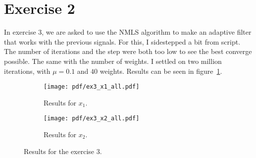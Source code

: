 \FloatBarrier
\section{Exercise 2}

In exercise 3, we are asked to use the NMLS algorithm to make an adaptive filter
that works with the previous signals. For this, I sidestepped a bit from script.
The number of iterations and the step were both too low to see the best converge
possible. The same with the number of weights. I settled on two million
iterations, with \(\mu=0.1\) and \(40\) weights. Results can be seen in
figure~\ref{fig:ex3res}.
\begin{figure}
    \centering
    \begin{subfigure}[t]{0.30\columnwidth}
        \centering
        \texttt{[image: pdf/ex3\_x1\_all.pdf]}
        \caption{Results for \(x_1\).}
    \end{subfigure} \hspace{1cm}
    \begin{subfigure}[t]{0.30\columnwidth}
        \centering
        \texttt{[image: pdf/ex3\_x2\_all.pdf]}
        \caption{Results for \(x_2\).}
    \end{subfigure}
    \caption{Results for the exercise 3.\label{fig:ex3res}}
\end{figure}
